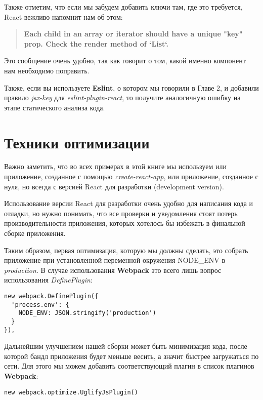 Также отметим, что если мы забудем добавить ключи там, где это требуется, React вежливо напомнит нам об этом:

\begin{quotation}
	\textbf{Each child in an array or iterator should have a unique "key" prop. Check the render method of `List`.}
\end{quotation}

Это сообщение очень удобно, так как говорит о том, какой именно компонент нам необходимо поправить.

Также, если вы используете \textbf{Eslint}, о котором мы говорили в Главе 2, и добавили правило \textit{jsx-key} для \textit{eslint-plugin-react}, то получите аналогичную ошибку на этапе статического анализа кода.


\section{Техники оптимизации}

Важно заметить, что во всех примерах в этой книге мы используем или приложение, созданное с помощью \textit{create-react-app}, или приложение, созданное с нуля, но всегда с версией React для разработки (development version). 

Использование версии React для разработки очень удобно для написания кода и отладки, но нужно понимать, что все проверки и уведомления стоят потерь производительности приложения, которых хотелось бы избежать в финальной сборке приложения.  

Таким образом, первая оптимизация, которую мы должны сделать, это собрать приложение при установленной переменной окружения NODE\_ENV в \textit{production}. 
В случае использования \textbf{Webpack} это всего лишь вопрос использования \textit{DefinePlugin}:


\begin{lstlisting}
new webpack.DefinePlugin({
  'process.env': {
    NODE_ENV: JSON.stringify('production')
  }
}),
\end{lstlisting}

Дальнейшим улучшением нашей сборки может быть минимизация кода, после которой бандл приложения будет меньше весить, а значит быстрее загружаться по сети. Для этого мы можем добавить соответствующий плагин в список плагинов \textbf{Webpack}:

\begin{lstlisting}
new webpack.optimize.UglifyJsPlugin()
\end{lstlisting}

